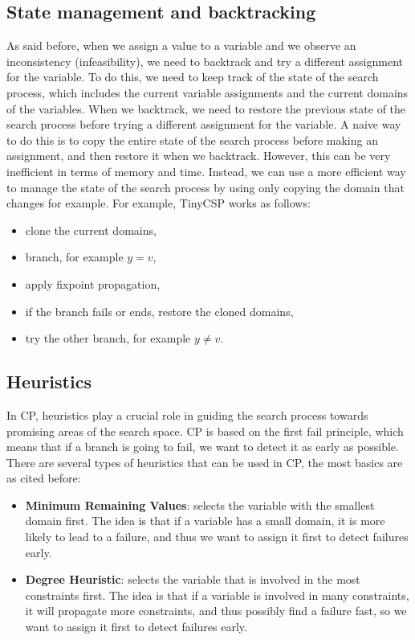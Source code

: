 \documentclass[12pt, openany]{report}
\theoremstyle{definition}
\begin{document}
\subsection{State management and backtracking}
As said before, when we assign a value to a variable and we observe an inconsistency (infeasibility), we need to backtrack and try a different assignment for the variable. To do this, we need to keep track of the state of the search process, which includes the current variable assignments and the current domains of the variables. When we backtrack, we need to restore the previous state of the search process before trying a different assignment for the variable. A naive way to do this is to copy the entire state of the search process before making an assignment, and then restore it when we backtrack. However, this can be very inefficient in terms of memory and time. Instead, we can use a more efficient way to manage the state of the search process by using only copying the domain that changes for example. For example, TinyCSP works as follows:
\begin{itemize}
    \item clone the current domains,
    \item branch, for example $y = v$,
    \item apply fixpoint propagation,
    \item if the branch fails or ends, restore the cloned domains,
    \item try the other branch, for example $y \neq v$.
\end{itemize}
\subsection{Heuristics}
In CP, heuristics play a crucial role in guiding the search process towards promising areas of the search space. CP is based on the first fail principle, which means that if a branch is going to fail, we want to detect it as early as possible. There are several types of heuristics that can be used in CP, the most basics are as cited before:
\begin{itemize}
    \item \textbf{Minimum Remaining Values}: selects the variable with the smallest domain first. The idea is that if a variable has a small domain, it is more likely to lead to a failure, and thus we want to assign it first to detect failures early.
    \item \textbf{Degree Heuristic}: selects the variable that is involved in the most constraints first. The idea is that if a variable is involved in many constraints, it will propagate more constraints, and thus possibly find a failure fast, so we want to assign it first to detect failures early.
\end{itemize}
\end{document}
